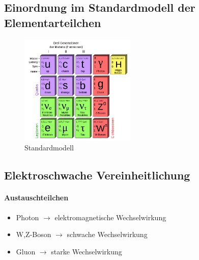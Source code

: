 \subsection{Einordnung im Standardmodell der Elementarteilchen}

\begin{iframe}
	\begin{figure}
		\centering
		\includegraphics[width=5.5cm]{img/standardmodel}
		\caption*{Standardmodell\cite{standardmodel}}
	\end{figure}
\end{iframe}


\subsection{Elektroschwache Vereinheitlichung}

\begin{iframe}


	\framesubtitle{Austauschteilchen}
	\begin{itemize}
		\pause
		\item Photon $\rightarrow$ elektromagnetische Wechselwirkung
		\pause
		\item W,Z-Boson $\rightarrow$ schwache Wechselwirkung
		\pause
		\item Gluon $\rightarrow$ starke Wechselwirkung
	\end{itemize}

\end{iframe}

